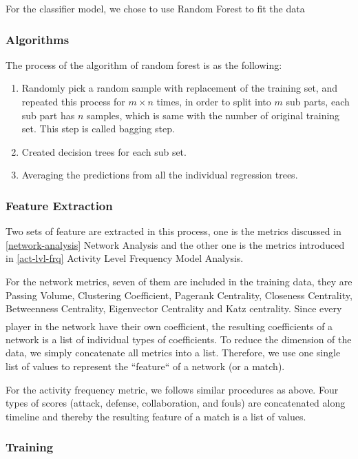 \documentclass{mcmthesis}
\newcommand{\upcite}[1]{\textsuperscript{\textsuperscript{\cite{#1}}}}
\begin{document}
For the classifier model, we chose to use Random Forest to fit the data

\subsubsection{Algorithms}
    The process of the algorithm of random forest is as the following: 
	\begin{enumerate}
		\item Randomly pick a random sample with replacement of the training set, and repeated this process for $m\times n$ times, in order to split into $m$ sub parts, each sub part has $n$ samples, which is same with the number of original training set. This step is called bagging step. 
		\item Created decision trees for each sub set. 
		\item Averaging the predictions from all the individual regression trees.
	\end{enumerate}

\subsubsection{Feature Extraction}

Two sets of feature are extracted in this process, one is the metrics discussed in \ref{network-analysis} Network Analysis and the other one is the metrics introduced in \ref{act-lvl-frq} Activity Level Frequency Model Analysis.

For the network metrics, seven of them are included in the training data, they are Passing Volume, Clustering Coefficient, Pagerank Centrality, Closeness Centrality, Betweenness Centrality, Eigenvector Centrality and Katz centrality. Since every player in the network have their own coefficient\upcite{1}, the resulting coefficients of a network is a list of individual types of coefficients. To reduce the dimension of the data, we simply concatenate all metrics into a list. Therefore, we use one single list of values to represent the ``feature`` of a network (or a match).

For the activity frequency metric, we follows similar procedures as above. Four types of scores (attack, defense, collaboration, and fouls) are concatenated
along timeline and thereby the resulting feature of a match is a list of values.

\subsubsection{Training}
\end{document}
